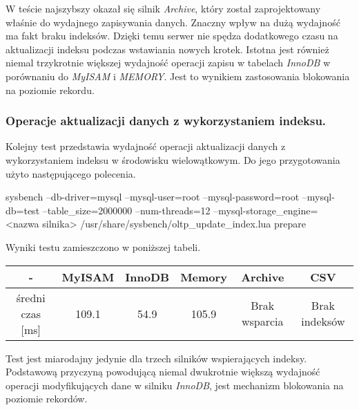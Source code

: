 W teście najszybszy okazał się silnik \textit{Archive}, który został zaprojektowany właśnie do wydajnego zapisywania danych. Znaczny wpływ na dużą wydajność ma fakt braku indeksów. Dzięki temu serwer nie spędza dodatkowego czasu na aktualizacji indeksu podczas wstawiania nowych krotek. Istotna jest również niemal trzykrotnie większej wydajność operacji zapisu w tabelach \textit{InnoDB} w porównaniu do \textit{MyISAM} i \textit{MEMORY}. Jest to wynikiem zastosowania blokowania na poziomie rekordu.

\subsubsection{Operacje aktualizacji danych z wykorzystaniem indeksu.}

Kolejny test przedstawia wydajność operacji aktualizacji danych z wykorzystaniem indeksu w środowisku wielowątkowym. Do jego przygotowania użyto następującego polecenia.
\begin{spverbatim}
	sysbench --db-driver=mysql --mysql-user=root --mysql-password=root 
	--mysql-db=test --table_size=2000000 --num-threads=12 
	--mysql-storage_engine=	<nazwa silnika> 
	/usr/share/sysbench/oltp_update_index.lua prepare
\end{spverbatim}

Wyniki testu zamieszczono w poniższej tabeli.
\begin{center}
	\begin{tabular}{ | c | c | c | c | c | c |}
		\hline
		- & MyISAM & InnoDB & Memory & Archive & CSV  \\ 
		\hline
		średni czas [ms] & 109.1 & 54.9 & 105.9 & Brak wsparcia & Brak indeksów \\
		\hline
	\end{tabular}
\end{center}

Test jest miarodajny jedynie dla trzech silników wspierających indeksy. Podstawową przyczyną powodującą niemal dwukrotnie większą wydajność operacji modyfikujących dane w silniku \textit{InnoDB}, jest mechanizm blokowania na poziomie rekordów.

